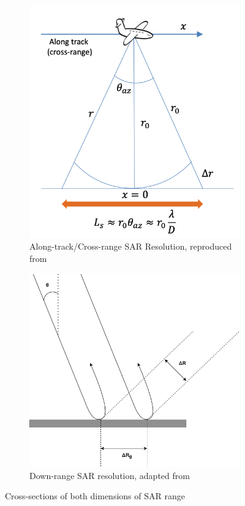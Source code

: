 \begin{figure}
\centering
\begin{subfigure}{.5\textwidth}
\centering
	\includegraphics[width=0.9\linewidth]{../figures/sar_along_track_res}
\caption{Along-track/Cross-range SAR Resolution, reproduced from \cite{watsonEE40136RadarSystems2020}}
\label{subfig:sar_along_track}

\end{subfigure}%
\begin{subfigure}{.5\textwidth}
	\centering
\includegraphics[width=0.9\linewidth]{../figures/down_range}	
\caption{Down-range SAR resolution, adapted from \cite{richardsRemoteSensingImaging2009}}
\label{subfig:down_range_SAR}
\end{subfigure}
\caption{Cross-sections of both dimensions of SAR range}
\label{fig:sar_range_cross_section}
\end{figure}


